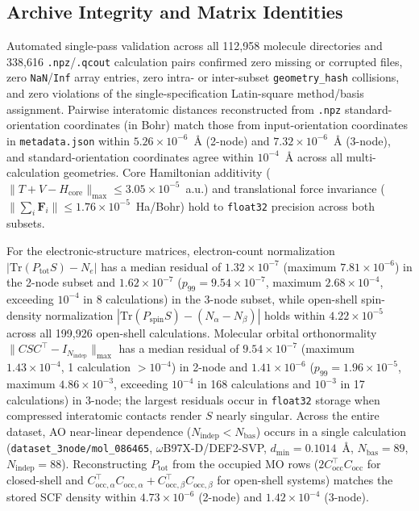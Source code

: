 \documentclass[fleqn,10pt]{article}
\begin{document}
\subsection*{Archive Integrity and Matrix Identities}

Automated single-pass validation across all 112,958 molecule directories and 338,616 \texttt{.npz}/\texttt{.qcout} calculation pairs confirmed zero missing or corrupted files, zero \texttt{NaN}/\texttt{Inf} array entries, zero intra- or inter-subset \texttt{geometry\_\allowbreak{}hash} collisions, and zero violations of the single-specification Latin-square method/basis assignment. Pairwise interatomic distances reconstructed from \texttt{.npz} standard-orientation coordinates (in Bohr) match those from input-orientation coordinates in \texttt{metadata.json} within $5.26 \times 10^{-6}$~\AA{} (2-node) and $7.32 \times 10^{-6}$~\AA{} (3-node), and standard-orientation coordinates agree within $10^{-4}$~\AA{} across all multi-calculation geometries. Core Hamiltonian additivity ($\|T + V - H_{\mathrm{core}}\|_{\max} \le 3.05 \times 10^{-5}$~a.u.) and translational force invariance ($\|\sum_i \mathbf{F}_i\| \le 1.76 \times 10^{-5}$~Ha/Bohr) hold to \texttt{float32} precision across both subsets.

For the electronic-structure matrices, electron-count normalization $|\mathrm{Tr}(P_{\mathrm{tot}} S) - N_e|$ has a median residual of $1.32 \times 10^{-7}$ (maximum $7.81 \times 10^{-6}$) in the 2-node subset and $1.62 \times 10^{-7}$ ($p_{99} = 9.54 \times 10^{-7}$, maximum $2.68 \times 10^{-4}$, exceeding $10^{-4}$ in 8 calculations) in the 3-node subset, while open-shell spin-density normalization $|\mathrm{Tr}(P_{\mathrm{spin}} S) - (N_\alpha - N_\beta)|$ holds within $4.22 \times 10^{-5}$ across all 199,926 open-shell calculations. Molecular orbital orthonormality $\|C S C^{\top} - I_{N_{\mathrm{indep}}}\|_{\max}$ has a median residual of $9.54 \times 10^{-7}$ (maximum $1.43 \times 10^{-4}$, 1 calculation $>10^{-4}$) in 2-node and $1.41 \times 10^{-6}$ ($p_{99} = 1.96 \times 10^{-5}$, maximum $4.86 \times 10^{-3}$, exceeding $10^{-4}$ in 168 calculations and $10^{-3}$ in 17 calculations) in 3-node; the largest residuals occur in \texttt{float32} storage when compressed interatomic contacts render $S$ nearly singular. Across the entire dataset, AO near-linear dependence ($N_{\mathrm{indep}} < N_{\mathrm{bas}}$) occurs in a single calculation (\texttt{dataset\_\allowbreak{}3node/mol\_\allowbreak{}086465}, $\omega$B97X-D/DEF2-SVP, $d_{\min} = 0.1014$~\AA{}, $N_{\mathrm{bas}} = 89$, $N_{\mathrm{indep}} = 88$). Reconstructing $P_{\mathrm{tot}}$ from the occupied MO rows ($2 C_{\mathrm{occ}}^{\top} C_{\mathrm{occ}}$ for closed-shell and $C_{\mathrm{occ},\alpha}^{\top} C_{\mathrm{occ},\alpha} + C_{\mathrm{occ},\beta}^{\top} C_{\mathrm{occ},\beta}$ for open-shell systems) matches the stored SCF density within $4.73 \times 10^{-6}$ (2-node) and $1.42 \times 10^{-4}$ (3-node).
\end{document}
